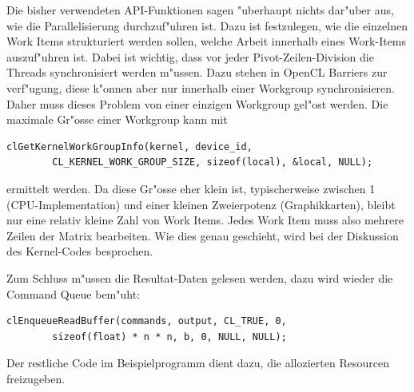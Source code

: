 Die bisher verwendeten API-Funktionen sagen "uberhaupt nichts dar"uber
aus, wie die Parallelisierung durchzuf"uhren ist. Dazu ist festzulegen,
wie die einzelnen Work Items strukturiert werden sollen, welche Arbeit
innerhalb eines Work-Items auszuf"uhren ist.
Dabei ist wichtig, dass vor jeder Pivot-Zeilen-Division die Threads
synchronisiert werden m"ussen. Dazu stehen in OpenCL Barriers
zur verf"ugung, diese k"onnen aber nur innerhalb einer Workgroup
synchronisieren. Daher muss dieses Problem von einer einzigen Workgroup
gel"ost werden. Die maximale Gr"osse einer Workgroup kann mit
\begin{verbatim}
clGetKernelWorkGroupInfo(kernel, device_id,
        CL_KERNEL_WORK_GROUP_SIZE, sizeof(local), &local, NULL);
\end{verbatim}
ermittelt werden.
Da diese Gr"osse eher klein ist, typischerweise
zwischen 1 (CPU-Implementation) und einer kleinen Zweierpotenz
(Graphikkarten), bleibt nur eine relativ kleine Zahl von Work Items.
Jedes Work Item muss also mehrere Zeilen der Matrix bearbeiten.
Wie dies genau geschieht, wird bei der Diskussion des Kernel-Codes
besprochen.

Zum Schluss m"ussen die Resultat-Daten gelesen werden, dazu wird wieder
die Command Queue bem"uht:
\begin{verbatim}
clEnqueueReadBuffer(commands, output, CL_TRUE, 0,
        sizeof(float) * n * n, b, 0, NULL, NULL);
\end{verbatim}
Der restliche Code im Beispielprogramm dient dazu, die allozierten
Resourcen freizugeben.

